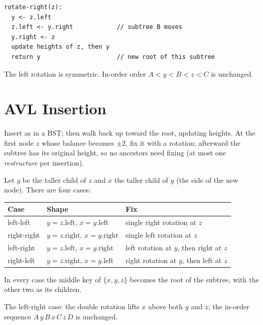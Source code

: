 \begin{lstlisting}
rotate-right(z):
  y <- z.left
  z.left <- y.right            // subtree B moves
  y.right <- z
  update heights of z, then y
  return y                     // new root of this subtree
\end{lstlisting}
The left rotation is symmetric. In-order order $A < y < B < z < C$ is unchanged.

\section{AVL Insertion}

Insert as in a BST; then walk back up toward the root, updating heights. At the
first node $z$ whose balance becomes $\pm 2$, fix it with a rotation; afterward
the subtree has its original height, so no ancestors need fixing (at most one
\emph{restructure} per insertion).

Let $y$ be the taller child of $z$ and $x$ the taller child of $y$ (the side of
the new node). There are four cases:
\begin{center}
\begin{tabular}{lll}
\toprule
Case & Shape & Fix\\
\midrule
left-left & $y = z.\text{left}$, $x = y.\text{left}$ & single right rotation at $z$\\
right-right & $y = z.\text{right}$, $x = y.\text{right}$ & single left rotation at $z$\\
left-right & $y = z.\text{left}$, $x = y.\text{right}$ & left rotation at $y$, then right at $z$\\
right-left & $y = z.\text{right}$, $x = y.\text{left}$ & right rotation at $y$, then left at $z$\\
\bottomrule
\end{tabular}
\end{center}
In every case the middle key of $\{x, y, z\}$ becomes the root of the subtree,
with the other two as its children.

\begin{center}
\end{center}
The left-right case: the double rotation lifts $x$ above both $y$ and $z$; the
in-order sequence $A\,y\,B\,x\,C\,z\,D$ is unchanged.

